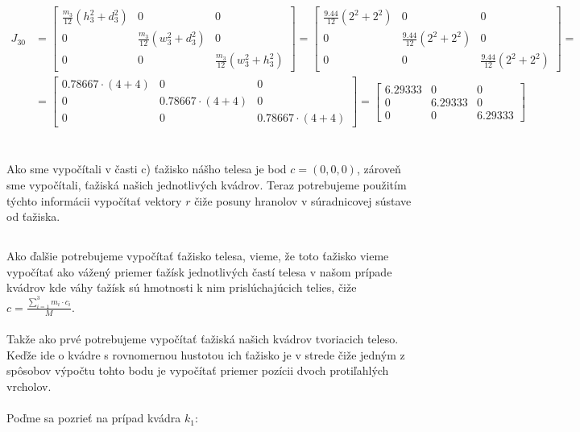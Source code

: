 \documentclass[a4paper]{article}
\begin{document}
\begin{align*}
		J_{30} &= \begin{bmatrix}
			\frac{m_3}{12}(h_3^2 + d_3^2) & 0 & 0 \\
			0 & \frac{m_3}{12}(w_3^2 + d_3^2) & 0 \\
			0 & 0 & \frac{m_3}{12}(w_3^2 + h_3^2)
		\end{bmatrix} =
		\begin{bmatrix}
			\frac{9.44}{12}(2^2 + 2^2) & 0 & 0 \\
			0 & \frac{9.44}{12}(2^2 + 2^2) & 0 \\
			0 & 0 & \frac{9.44}{12}(2^2 + 2^2)
		\end{bmatrix} =
		\\
		&= \begin{bmatrix}
			0.78667 \cdot (4 + 4) & 0 & 0 \\
			0 & 0.78667 \cdot (4 + 4) & 0 \\
			0 & 0 & 0.78667 \cdot (4 + 4)
		\end{bmatrix} =
		\begin{bmatrix}
			6.29333 & 0 & 0 \\
			0 & 6.29333 & 0 \\
			0 & 0 & 6.29333
		\end{bmatrix}
	\end{align*} 
	\\
	\\
	Ako sme  vypočítali v časti c) ťažisko nášho telesa je bod $c=(0,0,0)$, zároveň sme vypočítali, ťažiská našich jednotlivých kvádrov. Teraz potrebujeme použitím týchto informácii vypočítať vektory $r$ čiže posuny hranolov v súradnicovej sústave od ťažiska.
	
	\subsection{}
	
	Ako ďalšie potrebujeme vypočítať ťažisko telesa, vieme, že toto ťažisko vieme vypočítať ako vážený priemer ťažísk jednotlivých častí telesa v našom prípade kvádrov kde váhy ťažísk sú hmotnosti k nim prislúchajúcich telies, čiže $c = \frac{\sum_{i=1}^{3} m_i \cdot c_i}{M}$.
	\\
	\\
	Takže ako prvé potrebujeme vypočítať ťažiská našich kvádrov tvoriacich teleso. Keďže ide o kvádre s rovnomernou hustotou ich ťažisko je v strede čiže jedným z spôsobov výpočtu tohto bodu je vypočítať priemer pozícii dvoch protiľahlých vrcholov.
	\\
	\\
	Poďme sa pozrieť na prípad kvádra $k_1$:
	
\end{document}
